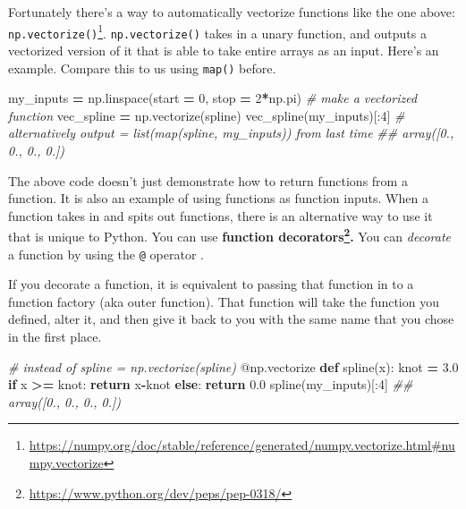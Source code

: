 \documentclass[12pt,krantz2]{krantz}
\makeatletter
\newenvironment{Shaded}{\begin{snugshade}}{\end{snugshade}}
\newcommand{\AttributeTok}[1]{\textcolor[rgb]{0.61,0.61,0.61}{#1}}
\newcommand{\CommentTok}[1]{\textcolor[rgb]{0.37,0.37,0.37}{\textit{#1}}}
\newcommand{\ControlFlowTok}[1]{\textcolor[rgb]{0.27,0.27,0.27}{\textbf{#1}}}
\newcommand{\DecValTok}[1]{\textcolor[rgb]{0.06,0.06,0.06}{#1}}
\newcommand{\FloatTok}[1]{\textcolor[rgb]{0.06,0.06,0.06}{#1}}
\newcommand{\KeywordTok}[1]{\textcolor[rgb]{0.27,0.27,0.27}{\textbf{#1}}}
\newcommand{\NormalTok}[1]{#1}
\newcommand{\OperatorTok}[1]{\textcolor[rgb]{0.43,0.43,0.43}{\textbf{#1}}}
\renewcommand{\href}[2]{#2\footnote{\url{#1}}}
\newenvironment{kframe}{%
\medskip{}
\setlength{\fboxsep}{.8em}
 \def\at@end@of@kframe{}%
 \ifinner\ifhmode%
  \def\at@end@of@kframe{\end{minipage}}%
  \begin{minipage}{\columnwidth}%
 \fi\fi%
 \def\FrameCommand##1{\hskip\@totalleftmargin \hskip-\fboxsep
 \colorbox{shadecolor}{##1}\hskip-\fboxsep
     \hskip-\linewidth \hskip-\@totalleftmargin \hskip\columnwidth}%
 \MakeFramed {\advance\hsize-\width
   \@totalleftmargin\z@ \linewidth\hsize
   \@setminipage}}%
 {\par\unskip\endMakeFramed%
 \at@end@of@kframe}
\renewenvironment{Shaded}{\begin{kframe}}{\end{kframe}}
\makeatother
\begin{document}
Fortunately there's a way to automatically vectorize functions like the one above: \href{https://numpy.org/doc/stable/reference/generated/numpy.vectorize.html\#numpy.vectorize}{\texttt{np.vectorize()}}. \texttt{np.vectorize()} takes in a unary function, and outputs a vectorized version of it that is able to take entire arrays as an input. Here's an example. Compare this to us using \texttt{map()} before.

\begin{Shaded}
\begin{Highlighting}[]
\NormalTok{my_inputs }\OperatorTok{=}\NormalTok{ np.linspace(start }\OperatorTok{=} \DecValTok{0}\NormalTok{, stop }\OperatorTok{=} \DecValTok{2}\OperatorTok{*}\NormalTok{np.pi)}
\CommentTok{# make a vectorized function}
\NormalTok{vec_spline }\OperatorTok{=}\NormalTok{ np.vectorize(spline) }
\NormalTok{vec_spline(my_inputs)[:}\DecValTok{4}\NormalTok{]}
\CommentTok{# alternatively output = list(map(spline, my_inputs)) from last time}
\CommentTok{## array([0., 0., 0., 0.])}
\end{Highlighting}
\end{Shaded}

The above code doesn't just demonstrate how to return functions from a function. It is also an example of using functions as function inputs. When a function takes in and spits out functions, there is an alternative way to use it that is unique to Python. You can use \textbf{\href{https://www.python.org/dev/peps/pep-0318/}{function decorators}.} You can \emph{decorate} a function by using the \texttt{@} operator \citep{Lutz13}.

If you decorate a function, it is equivalent to passing that function in to a function factory (aka outer function). That function will take the function you defined, alter it, and then give it back to you with the same name that you chose in the first place.

\begin{Shaded}
\begin{Highlighting}[]
\CommentTok{# instead of spline = np.vectorize(spline) }
\AttributeTok{@np.vectorize}
\KeywordTok{def}\NormalTok{ spline(x):}
\NormalTok{    knot }\OperatorTok{=} \FloatTok{3.0}
    \ControlFlowTok{if}\NormalTok{ x }\OperatorTok{>=}\NormalTok{ knot:}
        \ControlFlowTok{return}\NormalTok{ x}\OperatorTok{-}\NormalTok{knot}
    \ControlFlowTok{else}\NormalTok{:}
        \ControlFlowTok{return} \FloatTok{0.0}
\NormalTok{spline(my_inputs)[:}\DecValTok{4}\NormalTok{]}
\CommentTok{## array([0., 0., 0., 0.])}
\end{Highlighting}
\end{Shaded}
\end{document}

